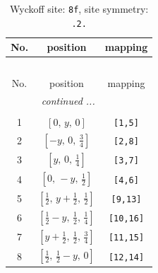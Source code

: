 \documentclass[fleqn,8pt]{jsarticle}
\begin{document}
\begin{longtable}{ccc}
\caption{Wyckoff site: {\tt 8f}, site symmetry: {\tt .2.}}
 \\
 \hline \hline
No. & position & mapping \\ \hline \endfirsthead

\multicolumn{2}{l}{\tablename\ \thetable{}} \\
 \hline \hline
No. & position & mapping \\ \hline \endhead

 \hline \hline
\multicolumn{2}{r}{\footnotesize\it continued ...} \\ \endfoot

 \hline \hline
\multicolumn{2}{r}{} \\ \endlastfoot

1 & $\left[ 0,\, y,\, 0 \right]$ & {\tt [1,5]} \\ \hline
2 & $\left[ - y,\, 0,\, \frac{3}{4} \right]$ & {\tt [2,8]} \\ \hline
3 & $\left[ y,\, 0,\, \frac{1}{4} \right]$ & {\tt [3,7]} \\ \hline
4 & $\left[ 0,\, - y,\, \frac{1}{2} \right]$ & {\tt [4,6]} \\ \hline
5 & $\left[ \frac{1}{2},\, y + \frac{1}{2},\, \frac{1}{2} \right]$ & {\tt [9,13]} \\ \hline
6 & $\left[ \frac{1}{2} - y,\, \frac{1}{2},\, \frac{1}{4} \right]$ & {\tt [10,16]} \\ \hline
7 & $\left[ y + \frac{1}{2},\, \frac{1}{2},\, \frac{3}{4} \right]$ & {\tt [11,15]} \\ \hline
8 & $\left[ \frac{1}{2},\, \frac{1}{2} - y,\, 0 \right]$ & {\tt [12,14]} \\
\end{longtable}
\renewcommand{\arraystretch}{1.2}
\end{document}
